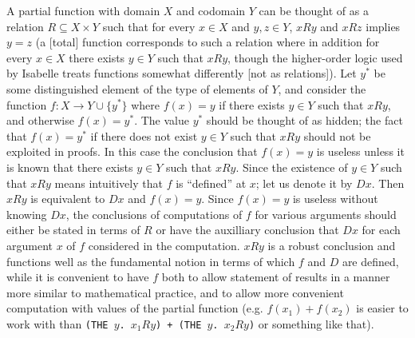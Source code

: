 \documentclass[leqno]{article}
\theoremstyle{definition}
\begin{document}
A partial function with domain $X$ and codomain $Y$ can be thought of as a relation $R \subseteq X \times Y$ such that for every $x \in X$ and $y, z \in Y$, $xRy$ and $xRz$ implies $y=z$ (a [total] function corresponds to such a relation where in addition for every $x \in X$ there exists $y \in Y$ such that $xRy$, though the higher-order logic used by Isabelle treats functions somewhat differently [not as relations]). Let $y^*$ be some distinguished element of the type of elements of $Y$, and consider the function $f\colon X \rightarrow Y \cup \{y^*\}$ where $f(x) = y$ if there exists $y \in Y$ such that $xRy$, and otherwise $f(x) = y^*$. The value $y^*$ should be thought of as hidden; the fact that $f(x) = y^*$ if there does not exist $y \in Y$ such that $xRy$ should not be exploited in proofs. In this case the conclusion that $f(x) = y$ is useless unless it is known that there exists $y \in Y$ such that $xRy$. Since the existence of $y \in Y$ such that $xRy$ means intuitively that $f$ is ``defined'' at $x$; let us denote it by $Dx$. Then $xRy$ is equivalent to $Dx$ and $f(x) = y$. Since $f(x) = y$ is useless without knowing $Dx$, the conclusions of computations of $f$ for various arguments should either be stated in terms of $R$ or have the auxilliary conclusion that $Dx$ for each argument $x$ of $f$ considered in the computation. $xRy$ is a robust conclusion and functions well as the fundamental notion in terms of which $f$ and $D$ are defined, while it is convenient to have $f$ both to allow statement of results in a manner more similar to mathematical practice, and to allow more convenient computation with values of the partial function (e.g. $f(x_1) + f(x_2)$ is easier to work with than \texttt{(THE $y$.\!\!\! $x_1Ry$) + (THE $y$.\!\!\! $x_2Ry$)} or something like that).
\end{document}
